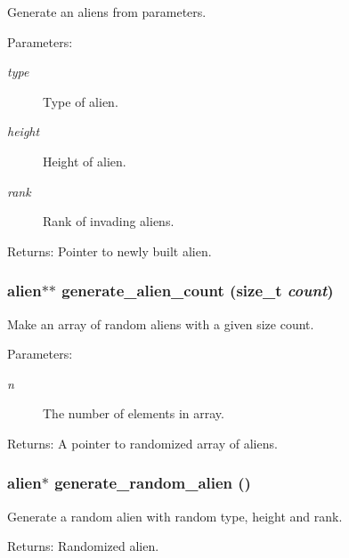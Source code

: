 Generate an aliens from parameters. 

\begin{Desc}
\item[Parameters:]
\begin{description}
\item[{\em type}]Type of alien. \item[{\em height}]Height of alien. \item[{\em rank}]Rank of invading aliens. \end{description}
\end{Desc}
\begin{Desc}
\item[Returns:]Pointer to newly built alien. \end{Desc}
\subsubsection{\setlength{\rightskip}{0pt plus 5cm}\bf{alien}$\ast$$\ast$ generate\_\-alien\_\-count (size\_\-t {\em count})}\label{struct_8c_4abbc00c9d775d15dc685826b02406cc}


Make an array of random aliens with a given size count. 

\begin{Desc}
\item[Parameters:]
\begin{description}
\item[{\em n}]The number of elements in array. \end{description}
\end{Desc}
\begin{Desc}
\item[Returns:]A pointer to randomized array of aliens. \end{Desc}
\subsubsection{\setlength{\rightskip}{0pt plus 5cm}\bf{alien}$\ast$ generate\_\-random\_\-alien ()}\label{struct_8c_dce2ee9ad53436d50ad36034cacaf4b1}


Generate a random alien with random type, height and rank. 

\begin{Desc}
\item[Returns:]Randomized alien. \end{Desc}
